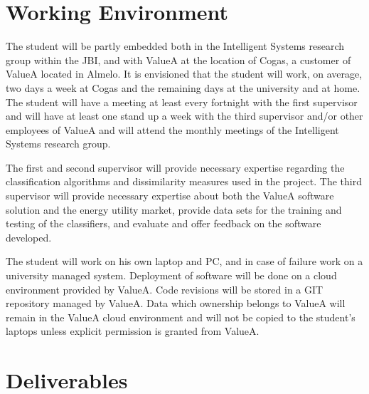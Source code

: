 \section{Working Environment}

The student will be partly embedded both in the Intelligent Systems research group within the JBI, and with ValueA at the location of Cogas, a customer of ValueA located in Almelo. It is envisioned that the student will work, on average, two days a week at Cogas and the remaining days at the university and at home. The student will have a meeting at least every fortnight with the first supervisor and will have at least one stand up a week with the third supervisor and/or other employees of ValueA and will attend the monthly meetings of the Intelligent Systems research group. 

The first and second supervisor will provide necessary expertise regarding the classification algorithms and dissimilarity measures used in the project. The third supervisor will provide necessary expertise about both the ValueA software solution and the energy utility market, provide data sets for the training and testing of the classifiers, and evaluate and offer feedback on the software developed.

The student will work on his own laptop and PC, and in case of failure work on a university managed system.  Deployment of software will be done on a cloud environment provided by ValueA. Code revisions will be stored in a GIT repository managed by ValueA. Data which ownership belongs to ValueA will remain in the ValueA cloud environment and will not be copied to the student’s laptops unless explicit permission is granted from ValueA.

\section{Deliverables}

